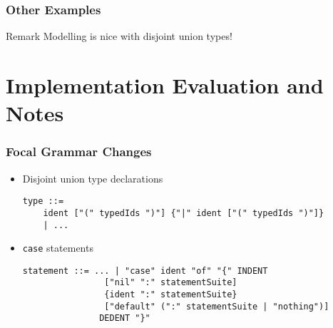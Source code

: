\documentclass{beamer}
\begin{document}
\begin{frame}
\frametitle{Other Examples}
    
\usebox{\exampleImagination}

\begin{block}{Remark}
Modelling is nice with disjoint union types!
\end{block}
\end{frame}

\section{Implementation Evaluation and Notes}

\begin{frame}[fragile]
\frametitle{Focal Grammar Changes}

\begin{itemize}
 \item<1-> Disjoint union type declarations
    {\small \begin{verbatim}
type ::=
    ident ["(" typedIds ")"] {"|" ident ["(" typedIds ")"]} 
    | ...
            \end{verbatim}}

 \item<2-> \texttt{case} statements
{\small \begin{verbatim}
statement ::= ... | "case" ident "of" "{" INDENT 
                ["nil" ":" statementSuite] 
                {ident ":" statementSuite} 
                ["default" (":" statementSuite | "nothing")] 
               DEDENT "}"
    \end{verbatim}}

\end{itemize}

\end{frame}
\end{document}
